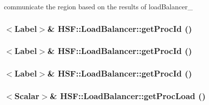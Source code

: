 communicate the region based on the results of loadBalancer\_ \hypertarget{classHSF_1_1LoadBalancer_a934f19588ae53f8f2133ddb0af955e15}{
\subsubsection[{getProcId}]{$<${\bf Label}$>$\& HSF::LoadBalancer::getProcId ()}}
\label{classHSF_1_1LoadBalancer_a934f19588ae53f8f2133ddb0af955e15}
\hypertarget{classHSF_1_1LoadBalancer_a934f19588ae53f8f2133ddb0af955e15}{
\subsubsection[{getProcId}]{$<${\bf Label}$>$\& HSF::LoadBalancer::getProcId ()}}
\label{classHSF_1_1LoadBalancer_a934f19588ae53f8f2133ddb0af955e15}
\hypertarget{classHSF_1_1LoadBalancer_a934f19588ae53f8f2133ddb0af955e15}{
\subsubsection[{getProcId}]{$<${\bf Label}$>$\& HSF::LoadBalancer::getProcId ()}}
\label{classHSF_1_1LoadBalancer_a934f19588ae53f8f2133ddb0af955e15}
\hypertarget{classHSF_1_1LoadBalancer_a969ba490fb82cdb116643d670b8c66b2}{
\subsubsection[{getProcLoad}]{$<${\bf Scalar}$>$\& HSF::LoadBalancer::getProcLoad ()}}
